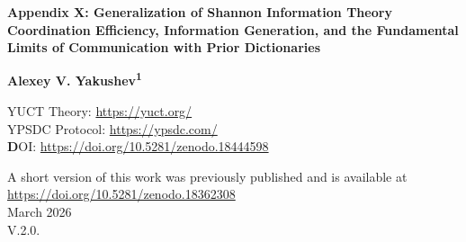 \documentclass[12pt,a4paper]{article}
\theoremstyle{remark}
\begin{document}
	
	\begin{titlepage}
		\begin{center}
			\vspace*{1cm}
			
			\Huge\textbf{Appendix X: Generalization of Shannon Information Theory} \\
			\vspace{0.5cm}
			\Large\textbf{Coordination Efficiency, Information Generation, and the Fundamental Limits of Communication with Prior Dictionaries}
			
			\vspace{1.5cm}
			
			\Large\textbf{Alexey V. Yakushev\textsuperscript{1}}
			
	YUCT Theory: \url{https://yuct.org/}\\
YPSDC Protocol: \url{https://ypsdc.com/}\\


\vspace{2cm}
\textbf DOI: \url{https://doi.org/10.5281/zenodo.18444598}\\

\vspace{1cm}

\vspace{0cm}
\large 
A short version of this work was previously published and is available at\\ \url{https://doi.org/10.5281/zenodo.18362308}\\
\vspace{1cm}
March 2026 \\ \large V.2.0.
			
			\vspace{2cm}
			

\end{center}
\end{titlepage}
\end{document}
